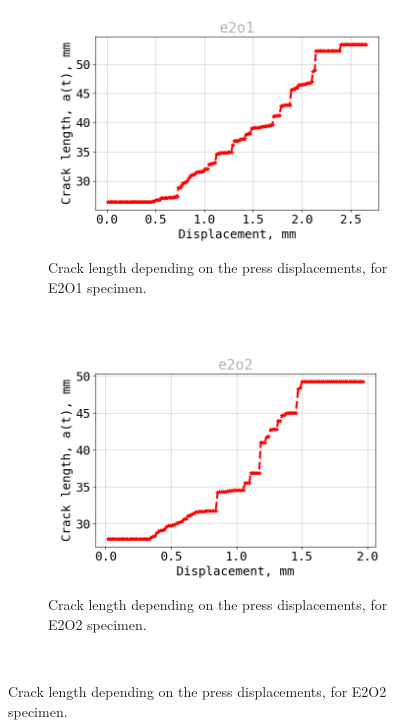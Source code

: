 \begin{figure}[H]
\centering
\begin{subfigure}{0.48\linewidth}
	\centering
	\includegraphics[width=\textwidth]{Figures/e2o1_a}
	\decoRule
	\caption[Crack length E2O1]{Crack length depending on the press displacements, for E2O1 specimen.}
	\label{fig:E2O1_a}
\end{subfigure}
\hfill\\
\begin{subfigure}{0.48\linewidth}
	\centering
	\includegraphics[width=\textwidth]{Figures/e2o2_a}
	\decoRule
	\caption[Crack length E2O2]{Crack length depending on the press displacements, for E2O2 specimen.}
	\label{fig:E2O2_a}
\end{subfigure}
\hfill\\

\end{figure}
